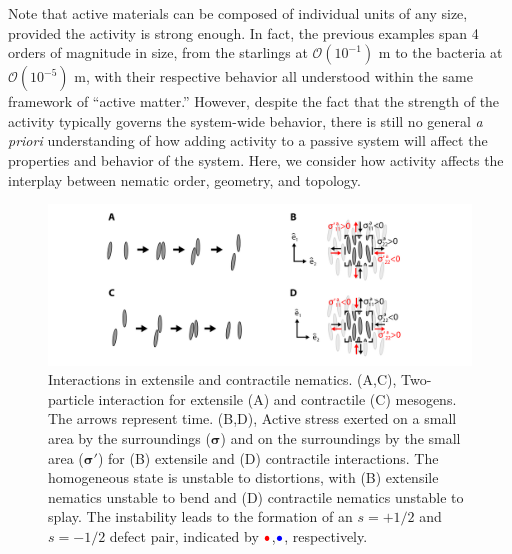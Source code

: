 Note that active materials can be composed of individual units of any size, provided the activity is strong enough.
In fact, the previous examples span 4 orders of magnitude in size, from the starlings at $\mathcal{O}(10^{-1})$ m to the bacteria at $\mathcal{O}(10^{-5})$ m, with their respective behavior all understood within the same framework of ``active matter.''
However, despite the fact that the strength of the activity typically governs the system-wide behavior, there is still no general \emph{a priori} understanding of how adding activity to a passive system will affect the properties and behavior of the system.
Here, we consider how activity affects the interplay between nematic order, geometry, and topology.
\begin{figure}
  \centering
  \includegraphics{figures/C3/Ch3-Figs_ActiveInteraction.png}
  \caption{Interactions in extensile and contractile nematics.
  (A,C), Two-particle interaction for extensile (A) and contractile (C) mesogens.
  The arrows represent time.
  (B,D), Active stress exerted on a small area by the surroundings ($\bm{\sigma}$) and on the surroundings by the small area ($\bm{\sigma}'$) for (B) extensile and (D) contractile interactions.
  The homogeneous state is unstable to distortions, with (B) extensile nematics unstable to bend and (D) contractile nematics unstable to splay.
  The instability leads to the formation of an $s = + 1/2$ and $s = -1/2$ defect pair, indicated by ${\color{red} \bullet}$,${\color{blue} \bullet}$, respectively.}\label{f:3-ActiveInteraction}
\end{figure}

